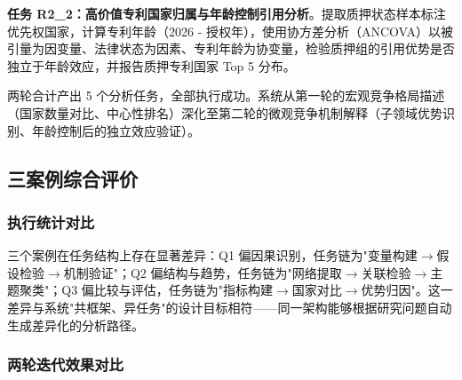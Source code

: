 \textbf{任务 R2\_2：高价值专利国家归属与年龄控制引用分析}。提取质押状态样本标注优先权国家，计算专利年龄（2026 - 授权年），使用协方差分析（ANCOVA）以被引量为因变量、法律状态为因素、专利年龄为协变量，检验质押组的引用优势是否独立于年龄效应，并报告质押专利国家 Top 5 分布。

两轮合计产出 5 个分析任务，全部执行成功。系统从第一轮的宏观竞争格局描述（国家数量对比、中心性排名）深化至第二轮的微观竞争机制解释（子领域优势识别、年龄控制后的独立效应验证）。

\subsection{三案例综合评价}

\subsubsection{执行统计对比}


\begin{table}[htbp]
\centering
\caption{三案例执行统计对比}
\label{tab:case-comparison}
\end{table}

三个案例在任务结构上存在显著差异：Q1 偏因果识别，任务链为"变量构建$\rightarrow$假设检验$\rightarrow$机制验证"；Q2 偏结构与趋势，任务链为"网络提取$\rightarrow$关联检验$\rightarrow$主题聚类"；Q3 偏比较与评估，任务链为"指标构建$\rightarrow$国家对比$\rightarrow$优势归因"。这一差异与系统"共框架、异任务"的设计目标相符——同一架构能够根据研究问题自动生成差异化的分析路径。

\subsubsection{两轮迭代效果对比}

